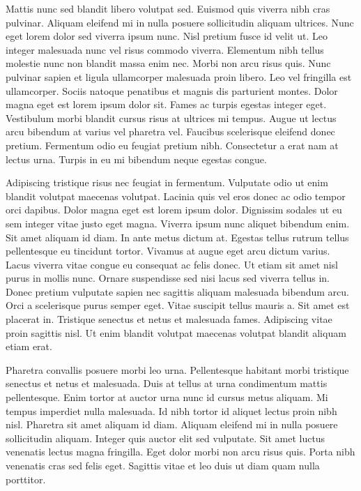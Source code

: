 \documentclass[12pt,ngerman,a4paper,oneside,,tablecaptionabove]{scrbook}
\begin{document}
Mattis nunc sed blandit libero volutpat sed. Euismod quis viverra nibh
cras pulvinar. Aliquam eleifend mi in nulla posuere sollicitudin aliquam
ultrices. Nunc eget lorem dolor sed viverra ipsum nunc. Nisl pretium
fusce id velit ut. Leo integer malesuada nunc vel risus commodo viverra.
Elementum nibh tellus molestie nunc non blandit massa enim nec. Morbi
non arcu risus quis. Nunc pulvinar sapien et ligula ullamcorper
malesuada proin libero. Leo vel fringilla est ullamcorper. Sociis
natoque penatibus et magnis dis parturient montes. Dolor magna eget est
lorem ipsum dolor sit. Fames ac turpis egestas integer eget. Vestibulum
morbi blandit cursus risus at ultrices mi tempus. Augue ut lectus arcu
bibendum at varius vel pharetra vel. Faucibus scelerisque eleifend donec
pretium. Fermentum odio eu feugiat pretium nibh. Consectetur a erat nam
at lectus urna. Turpis in eu mi bibendum neque egestas congue.

Adipiscing tristique risus nec feugiat in fermentum. Vulputate odio ut
enim blandit volutpat maecenas volutpat. Lacinia quis vel eros donec ac
odio tempor orci dapibus. Dolor magna eget est lorem ipsum dolor.
Dignissim sodales ut eu sem integer vitae justo eget magna. Viverra
ipsum nunc aliquet bibendum enim. Sit amet aliquam id diam. In ante
metus dictum at. Egestas tellus rutrum tellus pellentesque eu tincidunt
tortor. Vivamus at augue eget arcu dictum varius. Lacus viverra vitae
congue eu consequat ac felis donec. Ut etiam sit amet nisl purus in
mollis nunc. Ornare suspendisse sed nisi lacus sed viverra tellus in.
Donec pretium vulputate sapien nec sagittis aliquam malesuada bibendum
arcu. Orci a scelerisque purus semper eget. Vitae suscipit tellus mauris
a. Sit amet est placerat in. Tristique senectus et netus et malesuada
fames. Adipiscing vitae proin sagittis nisl. Ut enim blandit volutpat
maecenas volutpat blandit aliquam etiam erat.

Pharetra convallis posuere morbi leo urna. Pellentesque habitant morbi
tristique senectus et netus et malesuada. Duis at tellus at urna
condimentum mattis pellentesque. Enim tortor at auctor urna nunc id
cursus metus aliquam. Mi tempus imperdiet nulla malesuada. Id nibh
tortor id aliquet lectus proin nibh nisl. Pharetra sit amet aliquam id
diam. Aliquam eleifend mi in nulla posuere sollicitudin aliquam. Integer
quis auctor elit sed vulputate. Sit amet luctus venenatis lectus magna
fringilla. Eget dolor morbi non arcu risus quis. Porta nibh venenatis
cras sed felis eget. Sagittis vitae et leo duis ut diam quam nulla
porttitor.
\end{document}
